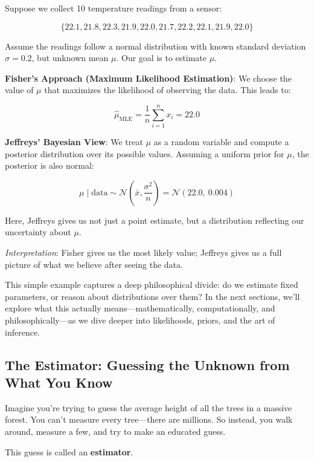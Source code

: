 \begin{example}
Suppose we collect 10 temperature readings from a sensor:

\[
\{22.1, 21.8, 22.3, 21.9, 22.0, 21.7, 22.2, 22.1, 21.9, 22.0\}
\]

Assume the readings follow a normal distribution with known standard deviation \( \sigma = 0.2 \), but unknown mean \( \mu \). Our goal is to estimate \( \mu \).

\textbf{Fisher's Approach (Maximum Likelihood Estimation)}:  
We choose the value of \( \mu \) that maximizes the likelihood of observing the data. This leads to:

\[
\hat{\mu}_{\text{MLE}} = \frac{1}{n} \sum_{i=1}^{n} x_i = 22.0
\]

\textbf{Jeffreys' Bayesian View}:  
We treat \( \mu \) as a random variable and compute a posterior distribution over its possible values. Assuming a uniform prior for \( \mu \), the posterior is also normal:

\[
\mu \mid \text{data} \sim \mathcal{N}\left(\bar{x}, \frac{\sigma^2}{n}\right) = \mathcal{N}(22.0,\ 0.004)
\]

Here, Jeffreys gives us not just a point estimate, but a distribution reflecting our uncertainty about \( \mu \).

\textit{Interpretation}:  
Fisher gives us the most likely value; Jeffreys gives us a full picture of what we believe after seeing the data.
\end{example}

This simple example captures a deep philosophical divide: do we estimate fixed parameters, or reason about distributions over them? In the next sections, we’ll explore what this actually means—mathematically, computationally, and philosophically—as we dive deeper into likelihoods, priors, and the art of inference.







\subsection{The Estimator: Guessing the Unknown from What You Know}

Imagine you're trying to guess the average height of all the trees in a massive forest. You can’t measure every tree—there are millions. So instead, you walk around, measure a few, and try to make an educated guess.

This guess is called an \textbf{estimator}.

